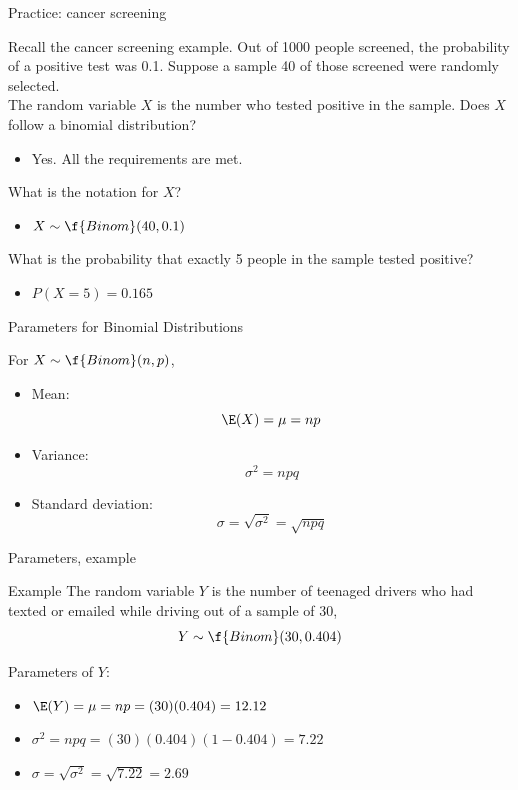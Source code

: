 \documentclass[xcolor=table, handout]{beamer}
\begin{document}
\begin{frame}{Practice: cancer screening}
\begin{block}{}
Recall the cancer screening example. Out of 1000 people screened, the probability of a positive test was 0.1. Suppose a sample 40 of those screened were randomly selected.\\
\medskip
\pause
The random variable $X$ is the number who tested positive in the sample. Does $X$ follow a binomial distribution?
\begin{itemize}
\pause\item Yes. All the requirements are met.
\end{itemize}
\medskip
\pause
What is the notation for $X$?
\begin{itemize}
\pause\item $X \sim \f{Binom}(40, 0.1)$
\end{itemize}
\medskip
\pause
What is the probability that exactly 5 people in the sample tested positive?
\begin{itemize}
\pause\item $P(X=5) = 0.165$
\end{itemize}
\end{block}
\end{frame}


\begin{frame}{Parameters for Binomial Distributions}
\begin{block}{}
For $X \sim \f{Binom}(n,p)$,
\begin{itemize}
\pause\item Mean:
\[ \E(X) = \mu = np\]
\vspace*{-\baselineskip}\pause\item Variance:
\[\sigma^2 = npq\]
\vspace*{-\baselineskip}\pause\item Standard deviation:
\[\sigma = \sqrt{\sigma^2} = \sqrt{npq}\]
\end{itemize}
\end{block}
\end{frame}

\begin{frame}{Parameters, example}
\begin{exampleblock}{Example}
The random variable $Y$ is the number of teenaged drivers who had texted or emailed while driving out of a sample of 30,
\[Y \sim \f{Binom}(30, 0.404)\]

Parameters of $Y$:
\begin{itemize}
\pause\item $\E(Y) = \mu = np = (30)(0.404) = 12.12$
\pause\item $\sigma^2 = npq = (30)(0.404)(1-0.404) = 7.22$
\pause\item $\sigma = \sqrt{\sigma^2} = \sqrt{7.22} = 2.69$
\end{itemize}
\end{exampleblock}
\end{frame}
\end{document}
